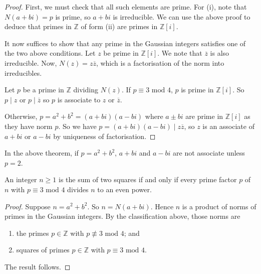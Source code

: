 \begin{proof}
	First, we must check that all such elements are prime.
	For (i), note that \( N(a+bi) = p \) is prime, so \( a+bi \) is irreducible.
	We can use the above proof to deduce that primes in \( \mathbb Z \) of form (ii) are primes in \( \mathbb Z[i] \).

	It now suffices to show that any prime in the Gaussian integers satisfies one of the two above conditions.
	Let \( z \) be prime in \( \mathbb Z[i] \).
	We note that \( \overline z \) is also irreducible.
	Now, \( N(z) = z\overline z \), which is a factorisation of the norm into irreducibles.

	Let \( p \) be a prime in \( \mathbb Z \) dividing \( N(z) \).
	If \( p \equiv 3 \text{ mod } 4 \), \( p \) is prime in \( \mathbb Z[i] \).
	So \( p \mid z \) or \( p \mid \overline z \) so \( p \) is associate to \( z \) or \( \overline z \).

	Otherwise, \( p = a^2 + b^2 = (a+bi)(a-bi) \) where \( a \pm bi \) are prime in \( \mathbb Z[i] \) as they have norm \( p \).
	So we have \( p = (a+bi)(a-bi) \mid z \overline z \), so \( z \) is an associate of \( a+bi \) or \( a-bi \) by uniqueness of factorisation.
\end{proof}
\begin{remark}
	In the above theorem, if \( p = a^2 + b^2 \), \( a+bi \) and \( a-bi \) are not associate unless \( p = 2 \).
\end{remark}
\begin{corollary}
	An integer \( n \geq 1 \) is the sum of two squares if and only if every prime factor \( p \) of \( n \) with \( p \equiv 3 \text{ mod } 4 \) divides \( n \) to an even power.
\end{corollary}
\begin{proof}
	Suppose \( n = a^2 + b^2 \).
	So \( n = N(a+bi) \).
	Hence \( n \) is a product of norms of primes in the Gaussian integers.
	By the classification above, those norms are
	\begin{enumerate}
		\item the primes \( p \in \mathbb Z \) with \( p \not\equiv 3 \text{ mod } 4 \); and
		\item squares of primes \( p \in \mathbb Z \) with \( p \equiv 3 \text{ mod } 4 \).
	\end{enumerate}
	The result follows.
\end{proof}
